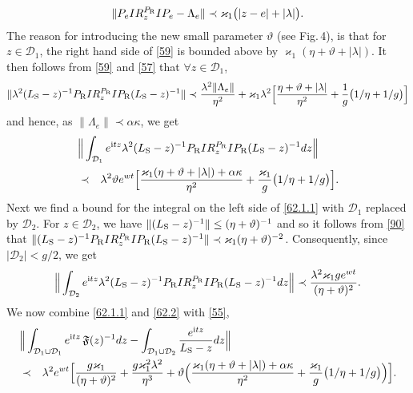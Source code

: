 \documentclass[letterpaper,onecolumn,11pt,accepted=2021-12-09]{quantumarticle}
\numberwithin{equation}{section}
\renewcommand{\r}{{\rm R}}
\newcommand{\s}{{\rm S}}
\renewcommand{\i}{{\rm i}}
\begin{document}
\begin{equation}
\label{59}
\| P_eI R_z^{P_\r}IP_e - \Lambda_e \| \prec \varkappa_1\big(|z-e|+|\lambda|\big).
\end{equation} 
The reason for introducing the new small parameter $\vartheta$ (see Fig.\,4), is that for $z\in{\mathcal D}_1$, the right hand side of \eqref{59} is bounded above by $\varkappa_1(\eta +\vartheta +|\lambda|)$. It then follows from \eqref{59} and \eqref{57} that $\forall z\in{\mathcal D}_1$, 
\begin{equation*}
\| \lambda^2 (L_\s-z)^{-1}  P_\r I R_z^{P_\r}I P_\r(L_\s-z)^{-1} \| \prec   \frac{\lambda^2 \|\Lambda_e\|}{\eta^2}  + \varkappa_1 \lambda^2 \Big[\frac{\eta+\vartheta+|\lambda|}{\eta^2} +\frac{1}{g}\big(1/\eta +1/g\big)\Big]
\end{equation*}
and hence, as $\|\Lambda_e\|\prec \alpha \kappa$, we get
\begin{eqnarray} 
		\label{62.1.1}
\lefteqn{	\Big\| \int_{{\mathcal D}_1} e^{\i tz} \lambda^2 (L_\s-z)^{-1}  P_\r I R_z^{P_\r}I P_\r(L_\s-z)^{-1} dz \Big\|}\\
& \prec& \lambda^2\vartheta e^{wt} \Big[\frac{\varkappa_1(\eta+\vartheta+|\lambda|)+\alpha\kappa}{\eta^2} +\frac{\varkappa_1}{g}\big(1/\eta +1/g\big)\Big]. 
\nonumber
\end{eqnarray}
Next we find a bound for the integral on the left side of \eqref{62.1.1} with ${\mathcal D}_1$ replaced by ${\mathcal D}_2$. For $z\in{\mathcal D}_2$, we have $\|(L_\s-z)^{-1}\|\le (\eta+\vartheta)^{-1}$ and so it follows from  \eqref{90} that $\|(L_\s-z)^{-1}  P_\r I R_z^{P_\r}I P_\r(L_\s-z)^{-1}\|\prec \varkappa_1(\eta+\vartheta)^{-2}$. Consequently, since $|{\mathcal D}_2|<g/2$, we get
\begin{equation}
\Big\|	\int_{{\mathcal D}_2} e^{\i tz} \lambda^2 (L_\s-z)^{-1}  P_\r I R_z^{P_\r}I P_\r(L_\s-z)^{-1}  dz\Big\|  \prec \frac{\lambda^2 \varkappa_1 g e^{wt}}{(\eta+\vartheta)^2}.
	\label{62.2}
\end{equation}
We now combine \eqref{62.1.1} and \eqref{62.2} with \eqref{55},
\begin{eqnarray}
\lefteqn{\Big\| \int_{{\mathcal D}_1\cup{\mathcal D}_1}  e^{\i tz} \, {\mathfrak F}(z)^{-1} dz  - \int_{{\mathcal D}_1\cup{\mathcal D}_2}  \frac{e^{\i tz}}{L_\s-z} dz \Big\|}	\label{62}\\
&\prec& \lambda^2 e^{wt}\Big[ \frac{g\varkappa_1}{(\eta+\vartheta)^2} + \frac{g\varkappa^2_1\lambda^2}{\eta^3} +\vartheta \Big(\frac{\varkappa_1(\eta+\vartheta+|\lambda|)+\alpha\kappa}{\eta^2} +\frac{\varkappa_1}{g}\big(1/\eta +1/g\big)\Big)
\Big].
\nonumber
\end{eqnarray}
\end{document}
